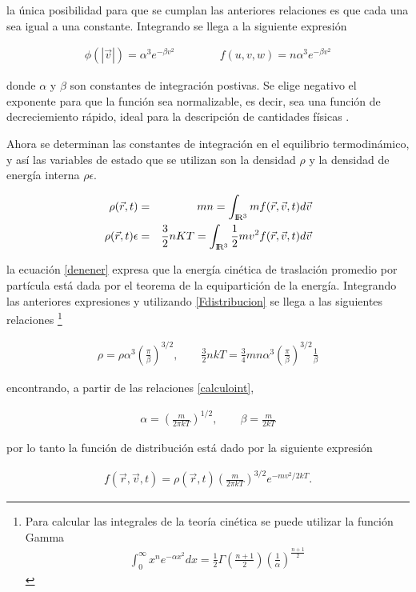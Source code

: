 \begin{itemize}
    la única posibilidad para que se cumplan las anteriores relaciones es que cada una sea igual a una constante. Integrando se llega a la siguiente expresión 
    
    \begin{eqnarray}
    \label{Fdistribucion}
    \phi(|\vec{v}|) = \alpha^{3} e^{-\beta v^{2}} \qquad\qquad  f(u,v,w) = n\alpha^{3}e^{-\beta v^{2}}
    \end{eqnarray}
    
    donde $\alpha$ y $\beta$ son constantes de integración postivas. Se elige negativo el exponente para que la función sea normalizable, es decir, sea una función de decreciemiento rápido, ideal para la descripción de cantidades físicas \cite{strichartz}.
    
    Ahora se determinan las constantes de integración en el equilibrio termodinámico, y así las variables de estado que se  utilizan son la densidad $\rho$ y la densidad de energía interna $\rho\epsilon$. 
    
    \begin{eqnarray}
    \label{rho}
    \rho(\vec{r},t) &=& mn = \int_{{\rm I\!R^{3}}}mf(\vec{r},\vec{v},t)d\vec{v}\\
    \label{denener}
    \rho(\vec{r},t)\epsilon &=& \frac{3}{2}nKT=\int_{{\rm I\!R^{3}}}\frac{1}{2}mv^{2}f(\vec{r},\vec{v},t)d\vec{v}
    \end{eqnarray}
    
    la ecuación \eqref{denener} expresa que la energía cinética de traslación promedio  por partícula está dada por el teorema de la equipartición de la energía. Integrando las anteriores expresiones y utilizando \eqref{Fdistribucion} se llega a las siguientes relaciones \footnote{Para calcular las integrales de la teoría cinética se puede utilizar la función Gamma 
    \begin{eqnarray}
    \int_{0}^{\infty}x^{n}e^{-\alpha x^{2}}dx = \frac{1}{2}\Gamma\left(\frac{n+1}{2}\right)\left(\frac{1}{\alpha}\right)^{\frac{n+1}{2}}
    \end{eqnarray}
     }
     
     \begin{eqnarray}
     \label{calculoint}
     \rho = \rho\alpha^{3}\left(\frac{\pi}{\beta}\right)^{3/2} , \qquad \frac{3}{2}nkT =\frac{3}{4}mn\alpha^{3}\left(\frac{\pi}{\beta}\right)^{3/2} \frac{1}{\beta}
     \end{eqnarray}
     
     encontrando,  a partir de las relaciones \eqref{calculoint},
     
     \begin{eqnarray}
     \boxed{
     \alpha = \left(\frac{m}{2\pi kT}\right)^{1/2}, \qquad \beta=\frac{m}{2kT}
     }
     \end{eqnarray}
    
    
    por lo tanto la función de distribución está dado por la siguiente expresión 
    
    \begin{eqnarray}
    f(\vec{r},\vec{v},t) = \rho(\vec{r},t)\left(\frac{m}{2\pi kT}\right)^{3/2}e^{-mv^{2}/2kT}.
    \end{eqnarray}

\end{itemize}
